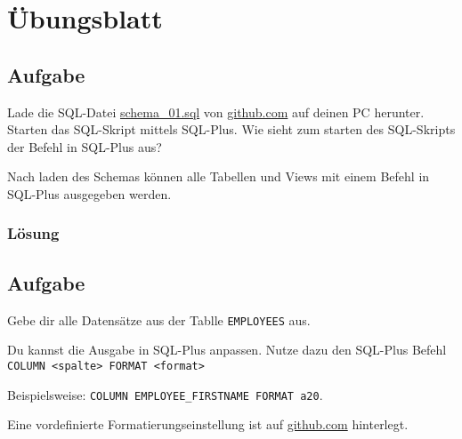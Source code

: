 \section{Übungsblatt}
\label{sec:uebung_01}

\subsection{Aufgabe}
\label{sec:uebung_01.aufgabe_01}
Lade die SQL-Datei \href{https://raw.githubusercontent.com/fh-trier/tgdb_ws1819/master/sql/schema_01.sql}{schema\_01.sql} von \href{https://raw.githubusercontent.com/fh-trier/tgdb_ws1819/master/sql/schema_01.sql}{github.com} auf deinen PC herunter. Starten das SQL-Skript mittels SQL-Plus. Wie sieht zum starten des SQL-Skripts der Befehl in SQL-Plus aus?

\begin{info-popup}
  Nach laden des Schemas können alle Tabellen und Views mit einem Befehl in SQL-Plus ausgegeben werden. \\
\end{info-popup}

\subsubsection*{Lösung}
\label{sec:uebung_01.aufgabe_01.loesung}

\subsection{Aufgabe}
\label{sec:uebung_01.aufgabe_02}
Gebe dir alle Datensätze aus der Tablle \texttt{EMPLOYEES} aus.

\begin{info-popup}
Du kannst die Ausgabe in SQL-Plus anpassen. Nutze dazu den SQL-Plus Befehl
\texttt{COLUMN <spalte> FORMAT <format>}

Beispielsweise: \texttt{COLUMN EMPLOYEE\_FIRSTNAME FORMAT a20}.

Eine vordefinierte Formatierungseinstellung ist auf \href{https://raw.githubusercontent.com/fh-trier/tgdb_ws1819/master/sql/sqlplus-settings.sql}{github.com} hinterlegt.

\end{info-popup}

